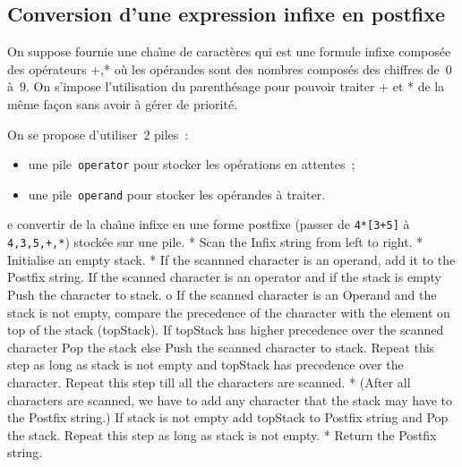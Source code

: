 \subsection{Conversion d'une expression infixe en postfixe}
On suppose fournie une cha\^\i{}ne de caract\`eres qui est une formule
infixe compos\'ee des op\'erateurs {+,*} o\`u les op\'erandes sont des
nombres compos\'es des chiffres de~$0$ \`a~$9$.  On s'impose
l'utilisation du parenth\'esage pour pouvoir traiter + et * de la
m\^eme fa\c{c}on sans avoir \`a g\'erer de priorit\'e.  
\par
On se propose d'utiliser~$2$ piles~:
\begin{itemize}
\item une pile~\verb+operator+ pour stocker les op\'erations en attentes~;
\item une pile~\verb+operand+ pour stocker les op\'erandes \`a traiter.
\end{itemize}
e convertir de la cha\^\i{}ne infixe
en une forme postfixe (passer de {\tt 4*[3+5]} \`a {\tt 4,3,5,+,*})
stock\'ee sur une pile.
    * Scan the Infix string from left to right.
    * Initialise an empty stack.
    * If the scannned character is an operand, add it to the Postfix string. If the scanned character is an operator and if the stack is empty Push the character to stack.
          o If the scanned character is an Operand and the stack is not empty, compare the precedence of the character with the element on top of the stack (topStack). If topStack has higher precedence over the scanned character Pop the stack else Push the scanned character to stack. Repeat this step as long as stack is not empty and topStack has precedence over the character.
      Repeat this step till all the characters are scanned.
    * (After all characters are scanned, we have to add any character that the stack may have to the Postfix string.) If stack is not empty add topStack to Postfix string and Pop the stack. Repeat this step as long as stack is not empty.
    * Return the Postfix string. 
